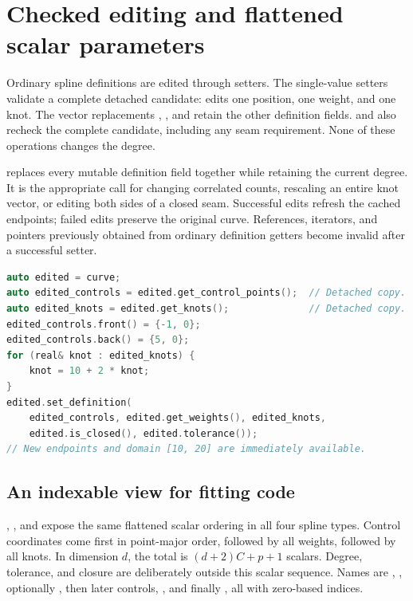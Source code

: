 \section{Checked editing and flattened scalar parameters}
\label{sec:spline-editing}

Ordinary spline definitions are edited through setters. The single-value
setters validate a complete detached candidate: 
edits one position,  one weight, and  one knot.
The vector replacements ,
, and  retain the other definition fields.
 and  also recheck the complete candidate,
including any seam requirement. None of these operations changes the degree.

 replaces
every mutable definition field together while retaining the current degree.
It is the appropriate call for changing correlated counts, rescaling an
entire knot vector, or editing both sides of a closed seam. Successful edits
refresh the cached endpoints; failed edits preserve the original curve.
References, iterators, and pointers previously obtained from ordinary
definition getters become invalid after a successful setter.

\begin{lstlisting}[language=C++,caption={Atomic bulk edits keep correlated changes together.}]
auto edited = curve;
auto edited_controls = edited.get_control_points();  // Detached copy.
auto edited_knots = edited.get_knots();              // Detached copy.
edited_controls.front() = {-1, 0};
edited_controls.back() = {5, 0};
for (real& knot : edited_knots) {
    knot = 10 + 2 * knot;
}
edited.set_definition(
    edited_controls, edited.get_weights(), edited_knots,
    edited.is_closed(), edited.tolerance());
// New endpoints and domain [10, 20] are immediately available.
\end{lstlisting}

\subsection{An indexable view for fitting code}

, , and
 expose the same flattened scalar ordering in all
four spline types. Control coordinates come first in point-major order,
followed by all weights, followed by all knots. In dimension $d$, the total is
$(d+2)C+p+1$ scalars. Degree, tolerance, and closure are deliberately outside
this scalar sequence. Names are , , optionally
, then later controls, , and finally , all
with zero-based indices.

